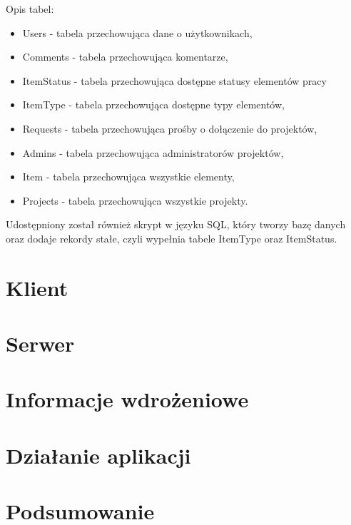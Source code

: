 \documentclass[11pt, titlepage]{article}
\begin{document}
Opis tabel:
\begin{itemize}
\item Users - tabela przechowująca dane o użytkownikach,
\item Comments - tabela przechowująca komentarze,
\item ItemStatus - tabela przechowująca dostępne statusy elementów pracy
\item ItemType - tabela przechowująca dostępne typy elementów,
\item Requests - tabela przechowująca prośby o dołączenie do projektów,
\item Admins - tabela przechowująca administratorów projektów,
\item Item - tabela przechowująca wszystkie elementy,
\item Projects - tabela przechowująca wszystkie projekty.
\end{itemize}

Udostępniony został również skrypt w języku SQL, który tworzy bazę danych oraz dodaje rekordy stałe, czyli wypełnia tabele ItemType oraz ItemStatus.

\section{Klient}
\section{Serwer}
\section{Informacje wdrożeniowe}
\section{Działanie aplikacji}
\section{Podsumowanie}
\end{document}
